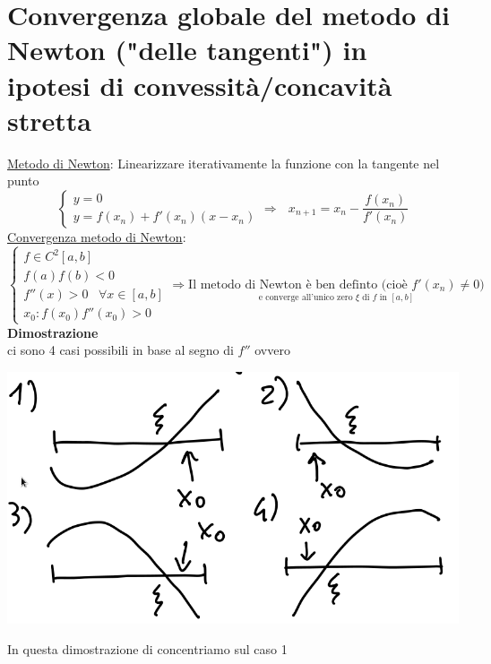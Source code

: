 \section{Convergenza globale del metodo di Newton ("delle tangenti") in ipotesi di convessità/concavità stretta}
\underline{Metodo di Newton}: Linearizzare iterativamente la funzione con la tangente nel punto
\[
\begin{cases}
	y = 0 \\
	y = f(x_n) + f'(x_n)(x-x_n) 
\end{cases}
\Rightarrow \,\,\,\,x_{n+1} = x_n - \frac{f(x_n)}{f'(x_n)}
\]
\underline{Convergenza metodo di Newton}:\\
\[
\begin{cases}
	f\in C^2[a,b]\\
	f(a)f(b)<0\\
	f''(x)>0 \,\,\,\,\, \forall x\in [a,b]\\
	x_0 : f(x_0)f''(x_0)>0
\end{cases}
\Rightarrow \underset{\text{e converge all'unico zero $\xi$ di $f$ in $[a,b]$}}{\text{Il metodo di Newton è ben definto (cioè $f'(x_n)\ne 0$)}}
\]
\textbf{Dimostrazione}\\
ci sono 4 casi possibili in base al segno di $f''$ ovvero
\begin{center}
	\includegraphics[scale=0.35]{pagina11_1.png}
\end{center}
In questa dimostrazione di concentriamo sul caso 1